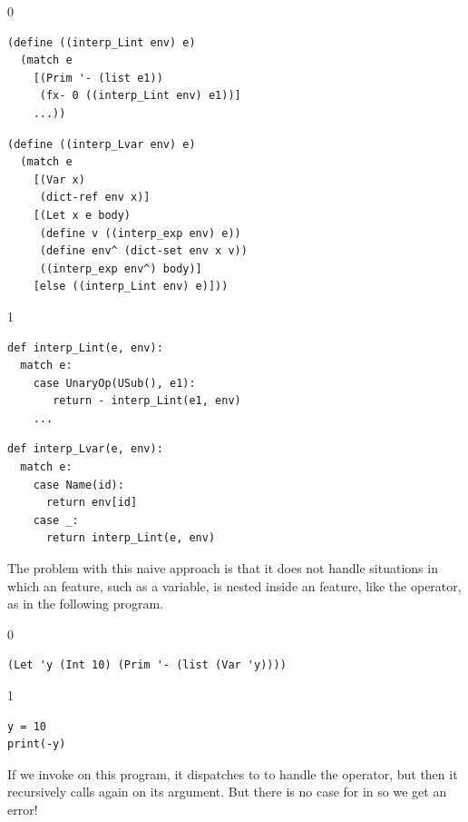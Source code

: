 \documentclass[7x10,nocrop]{TimesAPriori_MIT}%
\def\racketEd{0}
\def\pythonEd{1}
\def\edition{0}
\begin{document}
\begin{center}
{\if\edition\racketEd  
\begin{minipage}{0.45\textwidth}
\begin{lstlisting}
(define ((interp_Lint env) e)
  (match e
    [(Prim '- (list e1))
     (fx- 0 ((interp_Lint env) e1))]
    ...))
\end{lstlisting}
\end{minipage}
\begin{minipage}{0.45\textwidth}
  \begin{lstlisting}
(define ((interp_Lvar env) e)
  (match e
    [(Var x)
     (dict-ref env x)]
    [(Let x e body)
     (define v ((interp_exp env) e))
     (define env^ (dict-set env x v))
     ((interp_exp env^) body)]
    [else ((interp_Lint env) e)]))    
\end{lstlisting}
\end{minipage}
\fi}

{\if\edition\pythonEd
\begin{minipage}{0.45\textwidth}
\begin{lstlisting}
def interp_Lint(e, env):
  match e:
    case UnaryOp(USub(), e1):
       return - interp_Lint(e1, env)
    ...
\end{lstlisting}
\end{minipage}
\begin{minipage}{0.45\textwidth}
\begin{lstlisting}
def interp_Lvar(e, env):
  match e:
    case Name(id):
      return env[id]
    case _:
      return interp_Lint(e, env)
\end{lstlisting}
\end{minipage}
\fi}
\end{center}
The problem with this naive approach is that it does not handle
situations in which an \LangVar{} feature, such as a variable, is
nested inside an \LangInt{} feature, like the \code{-} operator, as in
the following program.
%
{\if\edition\racketEd
\begin{lstlisting}
(Let 'y (Int 10) (Prim '- (list (Var 'y))))
\end{lstlisting}
\fi}
{\if\edition\pythonEd
  \begin{lstlisting}
y = 10 
print(-y)
\end{lstlisting}
\fi}
%
\noindent If we invoke  on this program, it
dispatches to  to handle the \code{-} operator, but
then it recursively calls  again on its argument.
But there is no case for  in  so we get
an error!
\end{document}
